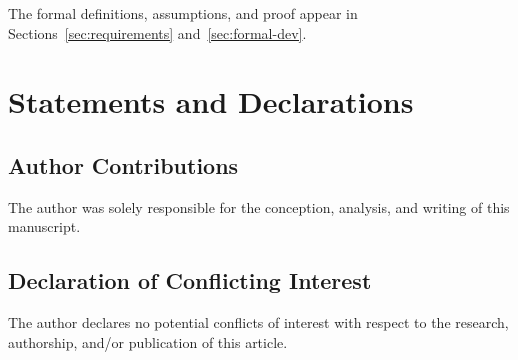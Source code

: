 \documentclass[11pt]{article}
\theoremstyle{plain}
\theoremstyle{definition}
\theoremstyle{remark}
\begin{document}
\medskip
\noindent
The formal definitions, assumptions, and proof appear in
Sections~\ref{sec:requirements} and~\ref{sec:formal-dev}.








\section*{Statements and Declarations}

\subsection*{Author Contributions}
The author was solely responsible for the conception, analysis, and writing of this manuscript.

\subsection*{Declaration of Conflicting Interest}
The author declares no potential conflicts of interest
with respect to the research, authorship,
and/or publication of this article.

\appendix
\clearpage



\end{document}
